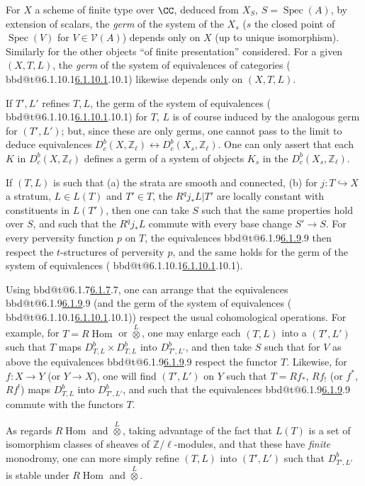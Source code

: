 \documentclass[12pt,oneside]{amsbook}
\makeatletter
\DeclareRobustCommand{\rn}[1]{%
  \ifcsname bbd@t@#1\endcsname\hyperlink{bbd:#1}{#1}\else#1\fi}
\theoremstyle{plain}
\theoremstyle{definition}
\newcommand{\ZZ}{\mathbb{Z}}  \newcommand{\QQ}{\mathbb{Q}}
\newcommand{\Zl}{\mathbb{Z}_{\ell}}
\newcommand{\Db}{D^{b}}
\DeclareMathOperator{\Spec}{Spec}
\newcommand{\RHom}{R\!\operatorname{Hom}}
\newcommand{\hra}{\hookrightarrow}
\makeatother
\begin{document}
\smallskip
For $X$ a scheme of finite type over $\CC$, deduced from $X_{S}$, $S=\Spec(A)$, by extension of scalars, the \emph{germ} of the system of the $X_{s}$ ($s$ the closed point of $\Spec(V)$ for $V\in \mathcal{V}(A)$) depends only on $X$ (up to unique isomorphism). Similarly for the other objects ``of finite presentation'' considered. For a given $(X,T,L)$, the \emph{germ} of the system of equivalences of categories (\rn{6.1.10.1}) likewise depends only on $(X,T,L)$.

\smallskip
If $T',L'$ refines $T,L$, the germ of the system of equivalences (\rn{6.1.10.1}) for $T$, $L$ is of course induced by the analogous germ for $(T',L')$; but, since these are only germs, one cannot pass to the limit to deduce equivalences $\Db_{c}(X,\Zl)\leftrightarrow \Db_{c}(X_{s},\Zl)$. One can only assert that each $K$ in $\Db_{c}(X,\Zl)$ defines a germ of a system of objects $K_{s}$ in the $\Db_{c}(X_{s},\Zl)$.

\smallskip
If $(T,L)$ is such that (a) the strata are smooth and connected, (b) for $j : T\hra X$ a stratum, $L\in L(T)$ and $T'\in T$, the $R^{q}j_{*}L|T'$ are locally constant with constituents in $L(T')$, then one can take $S$ such that the same properties hold over $S$, and such that the $R^{q}j_{*}L$ commute with every base change $S'\to S$. For every perversity function $p$ on $T$, the equivalences \rn{6.1.9} then respect the $t$-structures of perversity $p$, and the same holds for the germ of the system of equivalences (\rn{6.1.10.1}).

\smallskip
Using \rn{6.1.7}, one can arrange that the equivalences \rn{6.1.9} (and the germ of the system of equivalences (\rn{6.1.10.1})) respect the usual cohomological operations. For example, for $T = \RHom$ or $\overset{L}{\otimes}$, one may enlarge each $(T,L)$ into a $(T',L')$ such that $T$ maps $\Db_{T,L}\times \Db_{T,L}$ into $\Db_{T',L'}$, and then take $S$ such that for $V$ as above the equivalences \rn{6.1.9} respect the functor $T$. Likewise, for $f : X\to Y$ (or $Y\to X$), one will find $(T',L')$ on $Y$ such that $T = Rf_{*}$, $Rf_{!}$ (or $f^{*}$, $Rf^{!}$) maps $\Db_{T,L}$ into $\Db_{T',L'}$, and such that the equivalences \rn{6.1.9} commute with the functors $T$.

\smallskip
As regards $\RHom$ and $\overset{L}{\otimes}$, taking advantage of the fact that $L(T)$ is a set of isomorphism classes of sheaves of $\ZZ/\ell$-modules, and that these have \emph{finite} monodromy, one can more simply refine $(T,L)$ into $(T',L')$ such that $\Db_{T',L'}$ is stable under $\RHom$ and $\overset{L}{\otimes}$.
\end{document}
